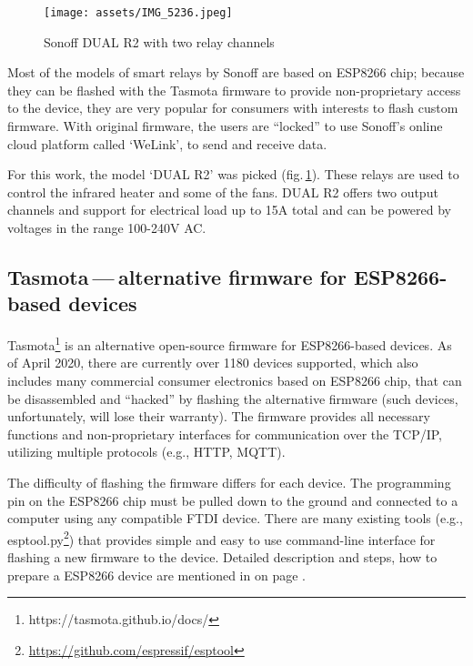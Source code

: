 \begin{figure}[h]{}
    \centering\texttt{[image: assets/IMG\_5236.jpeg]}
    \caption{Sonoff DUAL R2 with two relay channels}
    \label{dualr2}
\end{figure}

\pagebreak

Most of the models of smart relays by Sonoff are based on ESP8266 chip;
because they can be flashed with the Tasmota firmware to provide non-proprietary
access to the device, they are very popular for consumers with interests to
flash custom firmware. With original firmware, the users are ``locked'' to use
Sonoff’s online cloud platform called `WeLink', to send and receive data.

For this work, the model `DUAL R2' was picked (fig.\,\ref{dualr2}). 
These relays are used to
control the infrared heater and some of the fans. DUAL R2 offers two output
channels and support for electrical load up to 15A total and can be powered
by voltages in the range 100-240V AC.

\hypertarget{x-tasmota — alternative-firmware-for-esp8266-based-devices}{\subsection{Tasmota — alternative firmware for ESP8266-based devices}}
Tasmota\footnote{https://tasmota.github.io/docs/} is an alternative open-source 
firmware for ESP8266-based devices.
As of April 2020, there are currently over 1180 devices supported,\cite{tasdirec}
which also includes many commercial consumer electronics based on ESP8266 chip,
that can be disassembled and ``hacked'' by flashing the alternative firmware
(such devices, unfortunately, will lose their warranty).
The firmware provides all necessary functions and non-proprietary
interfaces for communication over the TCP/IP, utilizing multiple protocols
(e.g., HTTP, MQTT).


The difficulty of flashing the firmware differs for each device. The programming pin
on the ESP8266 chip must be pulled down to the ground and connected to a computer using
any compatible FTDI device. There are many existing tools (e.g., 
esptool.py\footnote{\href{https://github.com/espressif/esptool}{https://github.com/espressif/esptool}})
that provides simple and easy to use command-line
interface for flashing a new firmware to the device. Detailed description and
steps, how to prepare a ESP8266 device are mentioned in 
 on page \pageref{installguide}.

